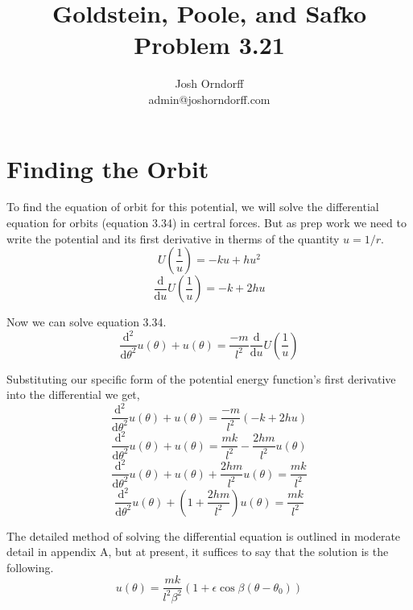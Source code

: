 \documentclass[10pt,a4paper]{article}
\begin{document}
\title{Goldstein, Poole, and Safko Problem 3.21}
\author{Josh Orndorff \\ admin@joshorndorff.com}
\maketitle

\section{Finding the Orbit}
To find the equation of orbit for this potential, we will solve the differential equation for orbits (equation 3.34) in certral forces.  But as prep work we need to write the potential and its first derivative in therms of the quantity $u=1/r$.
\begin{equation}
U\left(\frac{1}{u}\right)=-ku+hu^2
\end{equation}
\begin{equation}
\frac{\mathrm{d}}{\mathrm{d}u} U\left(\frac{1}{u}\right)=-k+2hu
\end{equation}

Now we can solve equation 3.34.
\begin{equation}
\frac{\mathrm{d}^2}{\mathrm{d}\theta^2}u(\theta)+u(\theta)=\frac{-m}{l^2}\frac{\mathrm{d}}{\mathrm{d}u} U\left(\frac{1}{u}\right)
\end{equation}

Substituting our specific form of the potential energy function's first derivative into the differential we get,
\begin{equation}
\frac{\mathrm{d}^2}{\mathrm{d}\theta^2}u(\theta)+u(\theta)=\frac{-m}{l^2}\left(-k+2hu\right)
\end{equation}
\begin{equation}
\frac{\mathrm{d}^2}{\mathrm{d}\theta^2}u(\theta)+u(\theta)=\frac{mk}{l^2}-\frac{2hm}{l^2}u(\theta)
\end{equation}
\begin{equation}
\frac{\mathrm{d}^2}{\mathrm{d}\theta^2}u(\theta)+u(\theta)+\frac{2hm}{l^2}u(\theta)=\frac{mk}{l^2}
\end{equation}
\begin{equation}
\frac{\mathrm{d}^2}{\mathrm{d}\theta^2}u(\theta)+\left(1+\frac{2hm}{l^2}\right)u(\theta)=\frac{mk}{l^2}
\end{equation}

The detailed method of solving the differential equation is outlined in moderate detail in appendix A, but at present, it suffices to say that the solution is the following.
\begin{equation}
u(\theta)=\frac{mk}{l^2\beta^2}(1+\epsilon\cos\beta(\theta-\theta_0))
\end{equation}
\end{document}
